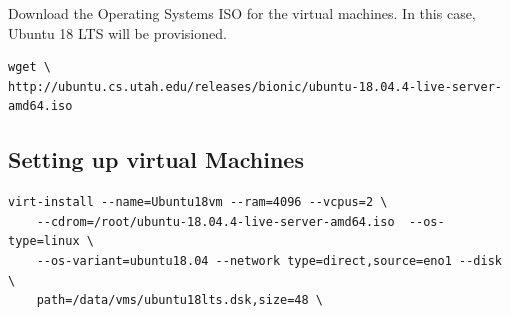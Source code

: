 \documentclass{article}
\begin{document}
Download the Operating Systems ISO for the virtual machines. In this case, Ubuntu 18 LTS will be provisioned.
\begin{Verbatim}[frame=single]
    wget \ 
http://ubuntu.cs.utah.edu/releases/bionic/ubuntu-18.04.4-live-server-amd64.iso
\end{Verbatim}

\subsection{Setting up virtual Machines}
\begin{Verbatim}[frame=single]
    virt-install --name=Ubuntu18vm --ram=4096 --vcpus=2 \
    --cdrom=/root/ubuntu-18.04.4-live-server-amd64.iso  --os-type=linux \
    --os-variant=ubuntu18.04 --network type=direct,source=eno1 --disk \
    path=/data/vms/ubuntu18lts.dsk,size=48 \
\end{Verbatim}
\end{document}
